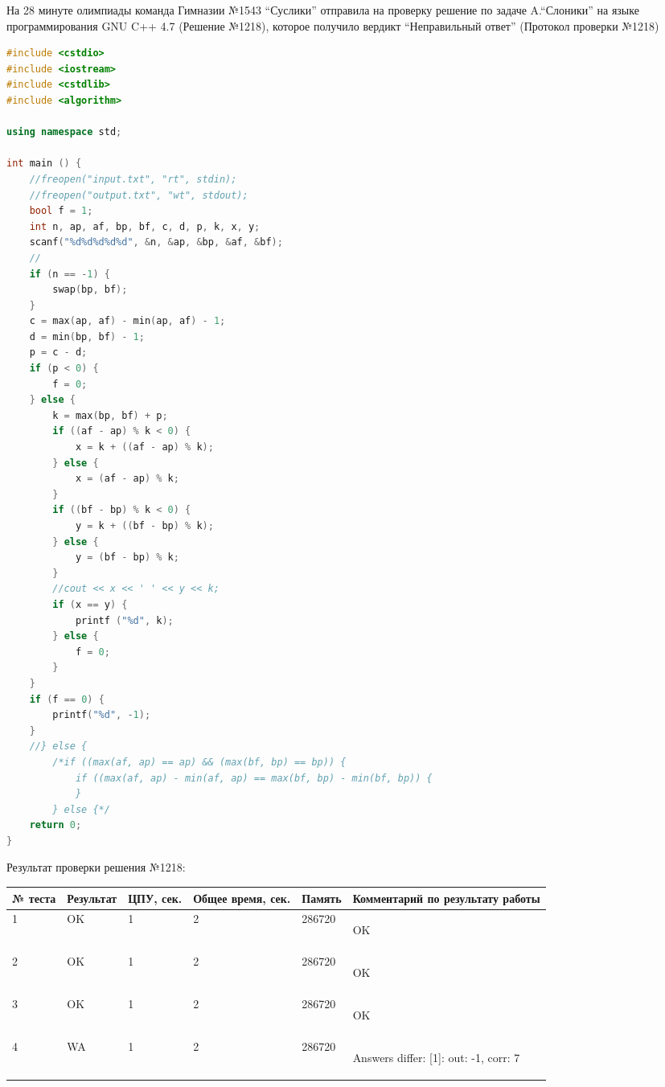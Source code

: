 На 28 минуте олимпиады команда Гимназии №1543 ``Суслики'' отправила на проверку решение по задаче A.``Слоники'' на языке программирования GNU C++ 4.7 (Решение №1218), которое получило вердикт ``Неправильный ответ'' (Протокол проверки №1218)
\begin{lstlisting}[language=c++, label=r1218, caption=Решение №1218]
#include <cstdio>
#include <iostream>
#include <cstdlib>
#include <algorithm>

using namespace std;

int main () {
	//freopen("input.txt", "rt", stdin);
	//freopen("output.txt", "wt", stdout);
	bool f = 1;
	int n, ap, af, bp, bf, c, d, p, k, x, y;
	scanf("%d%d%d%d%d", &n, &ap, &bp, &af, &bf);
	//
	if (n == -1) {
		swap(bp, bf);
	}
	c = max(ap, af) - min(ap, af) - 1;
	d = min(bp, bf) - 1;
	p = c - d;
	if (p < 0) {
		f = 0;
	} else {
		k = max(bp, bf) + p;
		if ((af - ap) % k < 0) {
			x = k + ((af - ap) % k);
		} else {
			x = (af - ap) % k;
		}
		if ((bf - bp) % k < 0) {
			y = k + ((bf - bp) % k);
		} else {
			y = (bf - bp) % k;
		}
		//cout << x << ' ' << y << k;
		if (x == y) {
			printf ("%d", k);
		} else {
			f = 0;
		}
	}
	if (f == 0) {
		printf("%d", -1);
	}
	//} else {
		/*if ((max(af, ap) == ap) && (max(bf, bp) == bp)) {
			if ((max(af, ap) - min(af, ap) == max(bf, bp) - min(bf, bp)) {
			}
		} else {*/
	return 0;
}

\end{lstlisting}


Результат проверки решения №1218:

 \begin{longtable}{|p{1cm}|p{2.5cm}|p{1.5cm}|p{2.5cm}|p{1.5cm}|p{5cm}|}\hline
№ теста & Результат & ЦПУ, сек. & Общее время, сек. & Память & Комментарий по результату работы \\ \hline 
1 & OK & 1 & 2 & 286720 & \begin{spverbatim}OK

\end{spverbatim}  \\ \hline
2 & OK & 1 & 2 & 286720 & \begin{spverbatim}OK

\end{spverbatim}  \\ \hline
3 & OK & 1 & 2 & 286720 & \begin{spverbatim}OK

\end{spverbatim}  \\ \hline
4 & WA & 1 & 2 & 286720 & \begin{spverbatim}Answers differ: [1]: out: -1, corr: 7

\end{spverbatim}  \\ \hline
\end{longtable}